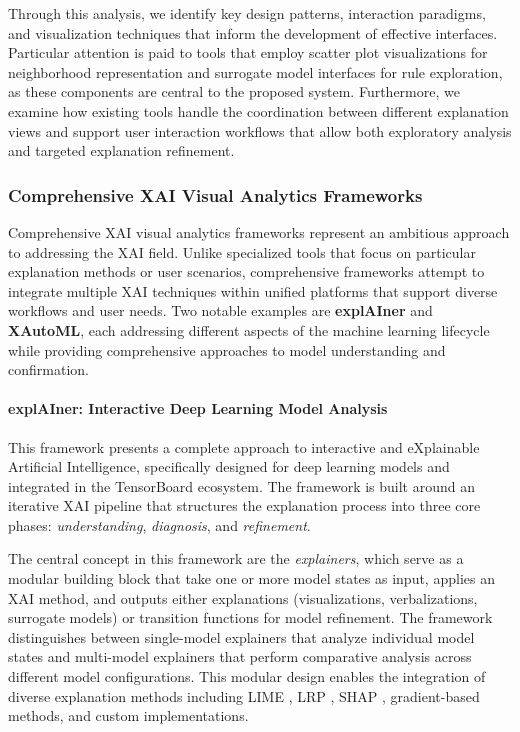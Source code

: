 Through this analysis, we identify key design patterns, interaction paradigms, and visualization techniques that inform the development of effective interfaces.
Particular attention is paid to tools that employ scatter plot visualizations for neighborhood representation and surrogate model interfaces for rule exploration, as these components are central to the proposed system. Furthermore, we examine how existing tools handle the coordination between different explanation views and support user interaction workflows that allow both exploratory analysis and targeted explanation refinement.

\subsubsection{Comprehensive XAI Visual Analytics Frameworks}

Comprehensive XAI visual analytics frameworks represent an ambitious approach to addressing the XAI field. Unlike specialized tools that focus on particular explanation methods or user scenarios, comprehensive frameworks attempt to integrate multiple XAI techniques within unified platforms that support diverse workflows and user needs. Two notable examples are \textbf{explAIner} and \textbf{XAutoML}, each addressing different aspects of the machine learning lifecycle while providing comprehensive approaches to model understanding and confirmation.

\paragraph{explAIner: Interactive Deep Learning Model Analysis}

This 
framework \cite{8807299} presents a complete approach to interactive and eXplainable Artificial Intelligence, specifically designed for deep learning models and integrated in the TensorBoard ecosystem. The framework is built around an iterative XAI pipeline that structures the explanation process into three core phases: \textit{understanding}, \textit{diagnosis}, and \textit{refinement}. 

The central concept in this framework are the \textit{explainers}, which serve as a modular building block that take one or more model states as input, applies an XAI method, and outputs either explanations (visualizations, verbalizations, surrogate models) or transition functions for model refinement. The framework distinguishes between single-model explainers that analyze individual model states and multi-model explainers that perform comparative analysis across different model configurations. This modular design enables the integration of diverse explanation methods including LIME \cite{ribeiro2016should}, LRP \cite{Bach2015OnPE}, SHAP \cite{lundberg2017unified}, gradient-based methods, and custom implementations.

